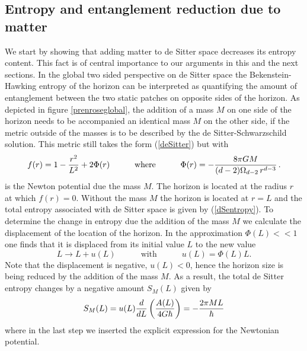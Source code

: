 \documentclass[a4paper,12pt]{article}
\newcommand{\be}{\begin{equation}}
\newcommand{\ee}{\end{equation}}
\begin{document}
  
 \subsection{Entropy and entanglement reduction due to matter}
 

 
We start by showing that adding matter to de Sitter space decreases its entropy content. This fact is of central importance to our arguments in this and the next sections.  %
In the global two sided perspective on de Sitter space the Bekenstein-Hawking entropy of the horizon can be interpreted as quantifying the amount of entanglement between the two static patches on opposite sides of the horizon. 
As depicted in figure \ref{prenroseglobal}, the addition of a mass $M$ on one side of the horizon needs to be  accompanied an identical mass $M$ on the other side, if the metric outside of the masses is
to be described by the de Sitter-Schwarzschild solution. This metric still takes the form (\ref{deSitter}) but with 
\be
\label{Phi(r)}
f(r) = 1- {r^2\over L^2} + 2\Phi(r)\qquad\quad\mbox{where}\qquad\quad \Phi(r) = - {8\pi G 
M\over (d-2)\Omega_{d-2} \,r^{d-3}} \, .
\ee
is the Newton potential due the mass $M$. 
The horizon is located at the radius $r$ at which $f(r)=0$. 
Without the mass $M$ the horizon is located at $r=L$ 
and the total entropy associated with de Sitter space is given by 
(\ref{dSentropy}).
To determine the change in entropy due the addition of the mass $M$ we calculate the 
displacement of the location of the horizon. In the approximation $\Phi(L) <\!\!< 1$ one 
finds that it is displaced from its initial value $L$ to the new value 
\be
L\to L+u(L) \qquad \quad\mbox{with} \qquad\quad u(L)=\Phi(L)L.
\ee 
 Note that the displacement is negative, $u(L) <0$, hence the horizon size is being reduced by the addition of the mass $M$. As a result, the total de Sitter entropy changes by a negative amount $S_M(L)$ given by
\be
\label{SML}
 S_M(L)   =  {u(L)} {d\over dL} \left({A(L)\over 4G\hbar}\right)  = -{2\pi M L \over \hbar} 
\ee
where in the last step we inserted the explicit expression for the Newtonian potential.
\end{document}
